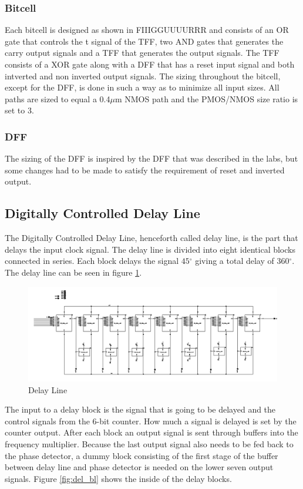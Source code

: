 \documentclass[a4paper,12pt]{article} \usepackage{graphicx}
\newcommand{\degree}{\ensuremath{^\circ}}
\begin{document}
\subsubsection{Bitcell}
Each bitcell is designed as shown in FIIIGGUUUURRR and consists of an OR gate 
that controls the t signal of the TFF, two AND gates that generates the carry 
output signals and a TFF that generates the output signals.
The TFF consists of a XOR gate along with a DFF that has a reset input signal and
both intverted and non inverted output signals.
The sizing throughout the bitcell, except for the DFF, is done in such a way as 
to minimize all input sizes. All paths are sized to equal a 0.4$\mu$m NMOS path
and the PMOS/NMOS size ratio is set to 3.
\subsubsection{DFF}
The sizing of the DFF is inspired by the DFF that was described in the labs, but
some changes had to be made to satisfy the requirement of reset and inverted output.
\subsection{Digitally Controlled Delay Line}
The Digitally Controlled Delay Line, henceforth called delay line, is the part
that delays the input clock signal. The delay line is divided into eight
identical blocks connected in series. Each block delays
the signal 
$45\degree$ giving a total delay of 360\degree. The delay line can be seen in
figure \ref{fig:del_line}. 

\begin{figure}[h]
        \centering
        \includegraphics[width=\textwidth]{../Bilder/Delay_Line/Delay_line_top.png}
        \caption{Delay Line}
        \label{fig:del_line}
\end{figure}
The input to a delay block is the signal that is going
to be delayed and the control signals from the 6-bit counter. How much a signal
is delayed is set by the counter output. After each block an output signal is sent
through buffers into the frequency multiplier. Because the last output signal
also needs to be fed back to the phase detector, a dummy block consisting of the
first stage of the buffer between delay line and phase detector is needed on
the lower seven output signals. Figure \ref{fig:del_bl} shows the inside of
the delay blocks.
\end{document}

